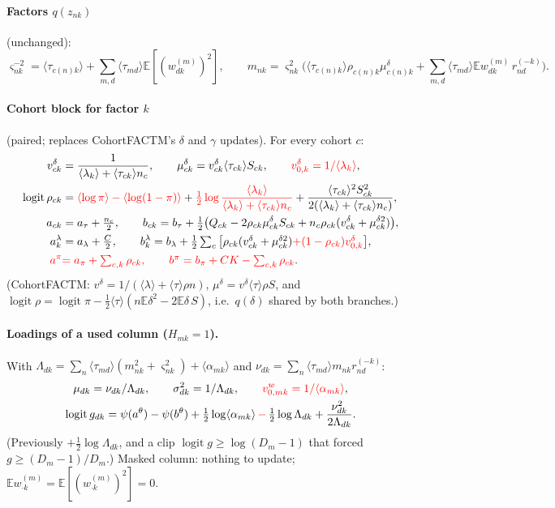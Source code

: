 \documentclass[11pt,a4paper]{article}
\newcommand{\new}[1]{{\color{red}#1}}
\newcommand{\E}{\mathbb{E}}
\newcommand{\logit}{\operatorname{logit}}
\theoremstyle{definition}
\theoremstyle{remark}
\begin{document}
\paragraph{Factors $q(z_{nk})$} (unchanged):
\[
\varsigma^{-2}_{nk}=\langle\tau_{c(n)k}\rangle+\sum_{m,d}\langle\tau_{md}\rangle\E[(w^{(m)}_{dk})^2],\qquad
m_{nk}=\varsigma^2_{nk}\Big(\langle\tau_{c(n)k}\rangle\rho_{c(n)k}\mu^\delta_{c(n)k}+\sum_{m,d}\langle\tau_{md}\rangle\E w^{(m)}_{dk}\,r^{(-k)}_{nd}\Big).
\]

\paragraph{Cohort block for factor $k$} (\new{paired}; replaces CohortFACTM's $\delta$ and $\gamma$ updates). For every cohort $c$:
\begin{align*}
v^\delta_{ck}&=\frac{1}{\langle\lambda_k\rangle+\langle\tau_{ck}\rangle n_c},\qquad \mu^\delta_{ck}=v^\delta_{ck}\langle\tau_{ck}\rangle S_{ck},\qquad
\new{v^\delta_{0,k}=1/\langle\lambda_k\rangle},\\
\logit\rho_{ck}&=\new{\langle\log\pi\rangle-\langle\log(1-\pi)\rangle}+\new{\tfrac12\log\frac{\langle\lambda_k\rangle}{\langle\lambda_k\rangle+\langle\tau_{ck}\rangle n_c}}+\frac{\langle\tau_{ck}\rangle^2S^2_{ck}}{2(\langle\lambda_k\rangle+\langle\tau_{ck}\rangle n_c)},\\
a_{ck}&=a_\tau+\tfrac{n_c}{2},\qquad b_{ck}=b_\tau+\tfrac12\big(Q_{ck}-2\rho_{ck}\mu^\delta_{ck}S_{ck}+n_c\rho_{ck}(v^\delta_{ck}+\mu^{\delta2}_{ck})\big),\\
a^\lambda_k&=a_\lambda+\tfrac C2,\qquad b^\lambda_k=b_\lambda+\tfrac12\textstyle\sum_c\big[\rho_{ck}(v^\delta_{ck}+\mu^{\delta2}_{ck})\new{+(1-\rho_{ck})v^\delta_{0,k}}\big],\\
\new{a^\pi}&\new{=a_\pi+\textstyle\sum_{c,k}\rho_{ck},\qquad b^\pi=b_\pi+CK-\sum_{c,k}\rho_{ck}}.
\end{align*}
(CohortFACTM: $v^\delta=1/(\langle\lambda\rangle+\langle\tau\rangle\rho n)$, $\mu^\delta=v^\delta\langle\tau\rangle\rho S$, and
$\logit\rho=\logit\pi-\tfrac12\langle\tau\rangle(n\E\delta^2-2\E\delta\,S)$, i.e.\ $q(\delta)$ shared by both branches.)

\paragraph{Loadings of a used column ($H_{mk}=1$).} With $\Lambda_{dk}=\sum_n\langle\tau_{md}\rangle(m_{nk}^2+\varsigma^2_{nk})+\langle\alpha_{mk}\rangle$ and
$\nu_{dk}=\sum_n\langle\tau_{md}\rangle m_{nk}r^{(-k)}_{nd}$:
\begin{gather*}
\mu_{dk}=\nu_{dk}/\Lambda_{dk},\qquad \sigma^2_{dk}=1/\Lambda_{dk},\qquad \new{v^w_{0,mk}=1/\langle\alpha_{mk}\rangle},\\
\logit g_{dk}=\psi(a^\theta)-\psi(b^\theta)+\tfrac12\log\langle\alpha_{mk}\rangle\new{\,-\,}\tfrac12\log\Lambda_{dk}+\frac{\nu_{dk}^2}{2\Lambda_{dk}}.
\end{gather*}
(Previously $+\tfrac12\log\Lambda_{dk}$, and a clip $\logit g\ge\log(D_m-1)$ that forced $g\ge(D_m-1)/D_m$.)
\new{Masked column: nothing to update; $\E w^{(m)}_{\cdot k}=\E[(w^{(m)}_{\cdot k})^2]=0$.}
\end{document}
